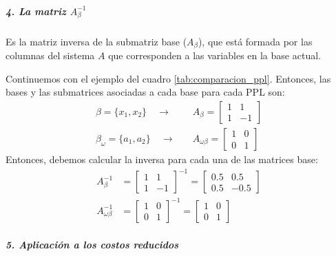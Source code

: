\subparagraph{4. La matriz \(A_\beta^{-1}\)}

Es la matriz inversa de la submatriz base (\(A_\beta\)), que está formada por las columnas del sistema \(A\) que corresponden a las variables en la base actual.

Continuemos con el ejemplo del cuadro \ref{tab:comparacion_ppl}. Entonces, las bases y las submatrices asociadas a cada base para cada PPL son:
\begin{align*}
  \beta = \{x_1,x_2\} \quad \rightarrow& \quad A_\beta = \begin{bmatrix} 1 & 1\\ 1 & -1 \end{bmatrix}\\[4pt]
  \beta_\omega = \{a_1, a_2\} \quad \rightarrow& \quad A_{\omega\beta} = \begin{bmatrix} 1 & 0\\ 0 & 1 \end{bmatrix}
\end{align*}
Entonces, debemos calcular la inversa para cada una de las matrices base:
\begin{align*}
  A_\beta^{-1} &= \begin{bmatrix} 1 & 1\\ 1 & -1 \end{bmatrix}^{-1} = \begin{bmatrix} 0.5 & 0.5\\ 0.5 & -0.5 \end{bmatrix}\\[4pt]
  A_{\omega\beta}^{-1} &= \begin{bmatrix} 1 & 0\\ 0 & 1 \end{bmatrix}^{-1} = \begin{bmatrix} 1 & 0\\ 0 & 1 \end{bmatrix}
\end{align*}

\subparagraph{5. Aplicación a los costos reducidos}

